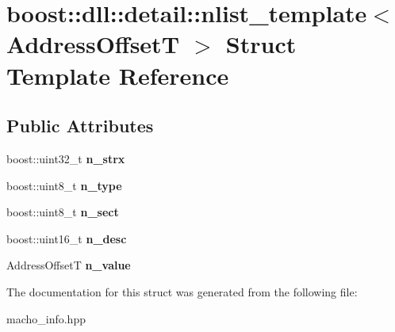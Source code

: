 \hypertarget{a00225}{}\section{boost\+:\+:dll\+:\+:detail\+:\+:nlist\+\_\+template$<$ Address\+OffsetT $>$ Struct Template Reference}
\label{a00225}
\subsection*{Public Attributes}
\begin{DoxyCompactItemize}
\item 
boost\+::uint32\+\_\+t {\bfseries n\+\_\+strx}\hypertarget{a00225_a02011979175132a2403606883049c6aa}{}\label{a00225_a02011979175132a2403606883049c6aa}

\item 
boost\+::uint8\+\_\+t {\bfseries n\+\_\+type}\hypertarget{a00225_a597db10945149a39964a09191115e9f9}{}\label{a00225_a597db10945149a39964a09191115e9f9}

\item 
boost\+::uint8\+\_\+t {\bfseries n\+\_\+sect}\hypertarget{a00225_a409f74be7ba738f62140a22296146086}{}\label{a00225_a409f74be7ba738f62140a22296146086}

\item 
boost\+::uint16\+\_\+t {\bfseries n\+\_\+desc}\hypertarget{a00225_a2a52c8ee6d401434108c6622f6c86267}{}\label{a00225_a2a52c8ee6d401434108c6622f6c86267}

\item 
Address\+OffsetT {\bfseries n\+\_\+value}\hypertarget{a00225_a325778c48bc26ca12841388b279f7eb6}{}\label{a00225_a325778c48bc26ca12841388b279f7eb6}

\end{DoxyCompactItemize}


The documentation for this struct was generated from the following file\+:\begin{DoxyCompactItemize}
\item 
macho\+\_\+info.\+hpp\end{DoxyCompactItemize}
